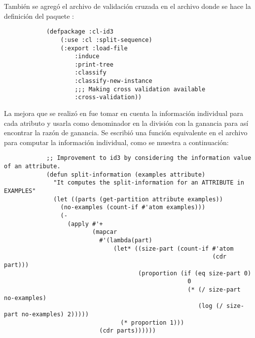 \begin{itemize}
\begin{solution}
        También se agregó el archivo de validación cruzada en el archivo donde se hace la definición del paquete :
        \begin{verbatim}
            (defpackage :cl-id3
                (:use :cl :split-sequence)
                (:export :load-file
                    :induce
                    :print-tree
                    :classify
                    :classify-new-instance
                    ;;; Making cross validation available
                    :cross-validation))
        \end{verbatim}

        La mejora que se realizó en  fue tomar en cuenta la información individual para cada atributo y usarla como denominador en la división con la ganancia para así encontrar la razón de ganancia. Se escribió una función equivalente en el archivo  para computar la información individual, como se muestra a continuación:
        \begin{verbatim}
            ;; Improvement to id3 by considering the information value of an attribute.
            (defun split-information (examples attribute)
              "It computes the split-information for an ATTRIBUTE in EXAMPLES"
              (let ((parts (get-partition attribute examples))
                (no-examples (count-if #'atom examples)))
                (- 
                  (apply #'+ 
                         (mapcar 
                           #'(lambda(part)
                               (let* ((size-part (count-if #'atom 
                                                           (cdr part)))
                                      (proportion (if (eq size-part 0) 
                                                    0
                                                    (* (/ size-part no-examples)
                                                       (log (/ size-part no-examples) 2)))))
                                 (* proportion 1)))
                           (cdr parts))))))
        \end{verbatim}


\end{solution}
\end{itemize}
